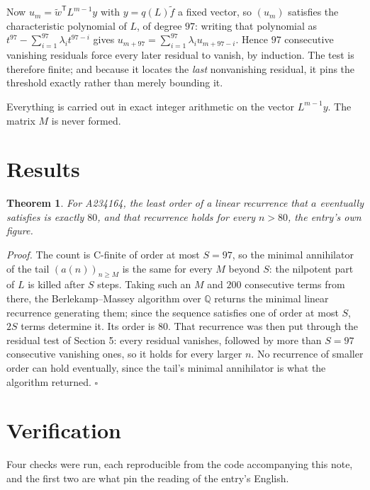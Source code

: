 \documentclass[11pt]{article}
\newtheorem{theorem}{Theorem}
\theoremstyle{definition}
\begin{document}
Now $u_m = \tilde w^{\mathsf T} L^{m-1} y$ with $y = q(L)\tilde f$ a fixed vector, so $(u_m)$ satisfies the characteristic polynomial of $L$, of degree $97$: writing that polynomial as $t^{97} - \sum_{i=1}^{97} \lambda_i t^{97-i}$ gives $u_{m+97} = \sum_{i=1}^{97} \lambda_i u_{m+97-i}$. Hence $97$ consecutive vanishing residuals force every later residual to vanish, by induction. The test is therefore finite; and because it locates the {\itshape last} nonvanishing residual, it pins the threshold exactly rather than merely bounding it.

Everything is carried out in exact integer arithmetic on the vector $L^{m-1}y$. The matrix $M$ is never formed.

\section{Results}

\begin{theorem} For A234164, the least order of a linear recurrence that $a$ eventually satisfies is exactly $80$, and that recurrence holds for every $n > 80$, the entry's own figure.\end{theorem}

{\itshape Proof.} The count is C-finite of order at most $S = 97$, so the minimal annihilator of the tail $(a(n))_{n \ge M}$ is the same for every $M$ beyond $S$: the nilpotent part of $L$ is killed after $S$ steps. Taking such an $M$ and $200$ consecutive terms from there, the Berlekamp--Massey algorithm over $\mathbb{Q}$ returns the minimal linear recurrence generating them; since the sequence satisfies one of order at most $S$, $2S$ terms determine it. Its order is $80$. That recurrence was then put through the residual test of Section 5: every residual vanishes, followed by more than $S = 97$ consecutive vanishing ones, so it holds for every larger $n$. No recurrence of smaller order can hold eventually, since the tail's minimal annihilator is what the algorithm returned. $\square$

\section{Verification}

Four checks were run, each reproducible from the code accompanying this note, and the first two are what pin the reading of the entry's English.
\end{document}
